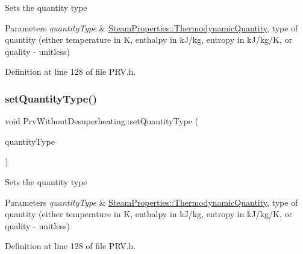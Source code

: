 Sets the quantity type


\begin{DoxyParams}{Parameters}
{\em quantity\+Type} & \hyperlink{class_steam_properties_ae0294bedf7d178c2d8fb6aed0f62fbff}{Steam\+Properties\+::\+Thermodynamic\+Quantity}, type of quantity (either temperature in K, enthalpy in k\+J/kg, entropy in k\+J/kg/K, or quality -\/ unitless) \\
\hline
\end{DoxyParams}


Definition at line 128 of file P\+R\+V.\+h.

\mbox{\label{class_prv_without_desuperheating_a212177b7a16c7452358df4120196c04b}} 
\subsubsection{\texorpdfstring{set\+Quantity\+Type()}{setQuantityType()}\hspace{0.1cm}{\footnotesize\ttfamily [2/3]}}
{\footnotesize\ttfamily void Prv\+Without\+Desuperheating\+::set\+Quantity\+Type (\begin{DoxyParamCaption}\item[{\hyperlink{class_steam_properties_ae0294bedf7d178c2d8fb6aed0f62fbff}{Steam\+Properties\+::\+Thermodynamic\+Quantity}}]{quantity\+Type }\end{DoxyParamCaption})\hspace{0.3cm}{\ttfamily [inline]}}

Sets the quantity type


\begin{DoxyParams}{Parameters}
{\em quantity\+Type} & \hyperlink{class_steam_properties_ae0294bedf7d178c2d8fb6aed0f62fbff}{Steam\+Properties\+::\+Thermodynamic\+Quantity}, type of quantity (either temperature in K, enthalpy in k\+J/kg, entropy in k\+J/kg/K, or quality -\/ unitless) \\
\hline
\end{DoxyParams}


Definition at line 128 of file P\+R\+V.\+h.

\mbox{\label{class_prv_without_desuperheating_a212177b7a16c7452358df4120196c04b}} 
